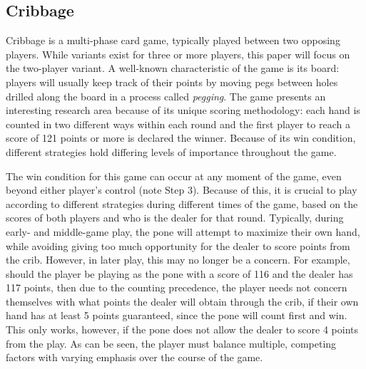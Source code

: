 

\subsection{Cribbage}

Cribbage is a multi-phase card game, typically played between two opposing
players.
%
While variants exist for three or more players, this paper will focus on the
two-player variant.
%
A well-known characteristic of the game is its board:
players will usually keep track of their points by moving pegs
between holes drilled along the board
in a process called \textit{pegging}.
%
The game presents an interesting research area because of its unique scoring
methodology:
each hand is counted in two different ways within each round and the
first player to reach a score of 121 points or more is declared the winner.
%
Because of its win condition, different strategies hold differing
levels of importance throughout the game.




The win condition for this game can occur at any moment of the game,
even beyond either player's control (note Step 3).
%
Because of this,
it is crucial to play according to different strategies during
different times of the game,
based on the scores of both players and who is the dealer for that round.
%
Typically, during early- and middle-game play,
the pone will attempt to maximize their own hand,
while avoiding giving too much opportunity for the dealer to score points from
the crib.
%
However, in later play, this may no longer be a concern.
%
For example, should the player be playing as the pone with a score of 116
and the dealer has 117 points,
then due to the counting precedence,
the player needs not concern themselves with what points the dealer will obtain
through the crib, if their own hand has at least 5 points guaranteed,
since the pone will count first and win.
%
This only works, however, if the pone does not allow the dealer to score 4
points from the play.
%
As can be seen, the player must balance multiple, competing factors with varying
emphasis over the course of the game.

